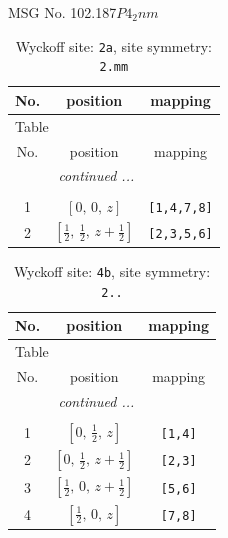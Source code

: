 \documentclass[fleqn,8pt]{jsarticle}
\begin{document}
\setcounter{MaxMatrixCols}{32}

\renewcommand{\tablename}{Table~}
\renewcommand{\figurename}{Figure~}
\begin{center}
\LARGE
MSG No. 102.187\quad$P4_{2}nm$
\end{center}
\renewcommand{\arraystretch}{1.2}
\begin{longtable}{ccc}
\caption{Wyckoff site: {\tt 2a}, site symmetry: {\tt 2.mm}}
 \\
 \hline \hline
No. & position & mapping \\ \hline \endfirsthead

\multicolumn{2}{l}{\tablename\ \thetable{}} \\
 \hline \hline
No. & position & mapping \\ \hline \endhead

 \hline \hline
\multicolumn{2}{r}{\footnotesize\it continued ...} \\ \endfoot

 \hline \hline
\multicolumn{2}{r}{} \\ \endlastfoot

1 & $\left[ 0,\, 0,\, z \right]$ & {\tt [1,4,7,8]} \\ \hline
2 & $\left[ \frac{1}{2},\, \frac{1}{2},\, z + \frac{1}{2} \right]$ & {\tt [2,3,5,6]} \\
\end{longtable}
\renewcommand{\arraystretch}{1.2}
\begin{longtable}{ccc}
\caption{Wyckoff site: {\tt 4b}, site symmetry: {\tt 2..}}
 \\
 \hline \hline
No. & position & mapping \\ \hline \endfirsthead

\multicolumn{2}{l}{\tablename\ \thetable{}} \\
 \hline \hline
No. & position & mapping \\ \hline \endhead

 \hline \hline
\multicolumn{2}{r}{\footnotesize\it continued ...} \\ \endfoot

 \hline \hline
\multicolumn{2}{r}{} \\ \endlastfoot

1 & $\left[ 0,\, \frac{1}{2},\, z \right]$ & {\tt [1,4]} \\ \hline
2 & $\left[ 0,\, \frac{1}{2},\, z + \frac{1}{2} \right]$ & {\tt [2,3]} \\ \hline
3 & $\left[ \frac{1}{2},\, 0,\, z + \frac{1}{2} \right]$ & {\tt [5,6]} \\ \hline
4 & $\left[ \frac{1}{2},\, 0,\, z \right]$ & {\tt [7,8]} \\
\end{longtable}
\end{document}
